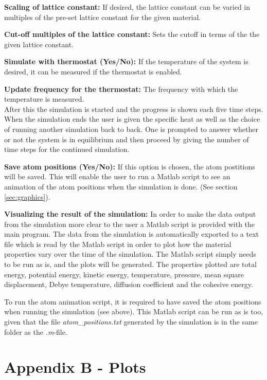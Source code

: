 \documentclass[12pt,a4paper]{article}
\begin{document}
\textbf{Scaling of lattice constant: }If desired, the lattice constant can be varied in multiples of the pre-set lattice constant for the given material. 

\textbf{Cut-off multiples of the lattice constant:} Sets the cutoff in terms of the the given lattice constant.

\textbf{Simulate with thermostat (Yes/No):} If the temperature of the system is desired, it can be measured if the thermostat is enabled. 

\textbf{Update frequency for the thermostat: }The frequency with which the temperature is measured. \\
After this the simulation is started and the progress is shown each five time steps. \\
When the simulation ends the user is given the specific heat as well as the choice of running another simulation back to back. One is prompted to answer whether or not the system is in equilibrium and then proceed by giving the number of time steps for the continued simulation. 

\textbf{Save atom positions (Yes/No):} If this option is chosen, the atom postitions will be saved. This will enable the user to run a Matlab script to see an animation of the atom positions when the simulation is done. (See section \ref{sec:graphics}).


\textbf{Visualizing the result of the simulation:} 
In order to make the data output from the simulation more clear to the user a Matlab script is provided with the main program. The data from the simulation is automatically exported to a text file which is read by the Matlab script in order to plot how the material properties vary over the time of the simulation. The Matlab script simply needs to be run as is, and the plots will be generated. The properties plotted are total energy, potential energy, kinetic energy, temperature, pressure, mean square displacement, Debye temperature, diffusion coefficient and the cohesive energy.

To run the atom animation script, it is required to have saved the atom positions when running the simulation (see above). This Matlab script can be run as is too, given that the file \emph{atom\_positions.txt} generated by the simulation is in the same folder as the \emph{.m}-file.  


\newpage
\section{Appendix B - Plots}
\label{sec:AppendixB}
\end{document}
